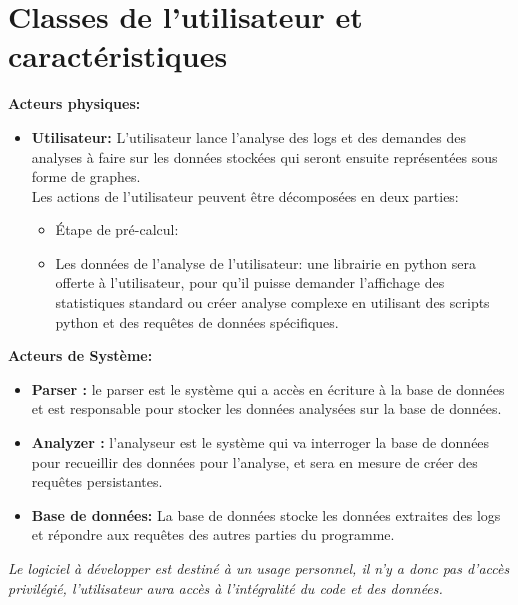 \documentclass{scrreprt}
\begin{document}
\section{Classes de l'utilisateur et caractéristiques}

\textbf{Acteurs physiques:}\\

\begin{itemize}
 \item \textbf{Utilisateur:} L'utilisateur lance l'analyse des logs et des demandes des analyses à faire sur les données stockées qui seront ensuite représentées sous forme de graphes.\\
   Les actions de l'utilisateur peuvent être décomposées en deux parties:
   \begin{itemize}
   \item Étape de pré-calcul: %
   \item Les données de l'analyse de l'utilisateur: une librairie en python sera offerte à l'utilisateur, pour qu'il puisse demander l'affichage des statistiques standard ou créer analyse complexe en utilisant des scripts python et des requêtes de données spécifiques. 
   \end{itemize}
\end{itemize}

\textbf{Acteurs de Système:}\\
\begin{itemize}
 \item \textbf{Parser :} le parser est le système qui a accès en écriture à la base de données et est responsable pour stocker les données analysées sur la base de données.

 \item \textbf{Analyzer :} l'analyseur est le système qui va interroger la base de données pour recueillir des données pour l'analyse, et sera en mesure de créer des requêtes persistantes.

   \item \textbf{Base de données: } La base de données stocke les données extraites des logs et répondre aux requêtes des autres parties du programme.
\end{itemize}

\textit{Le logiciel à développer est destiné à un usage personnel, il n'y a donc pas d'accès privilégié, l'utilisateur aura accès à l'intégralité du code et des données.}
\end{document}

